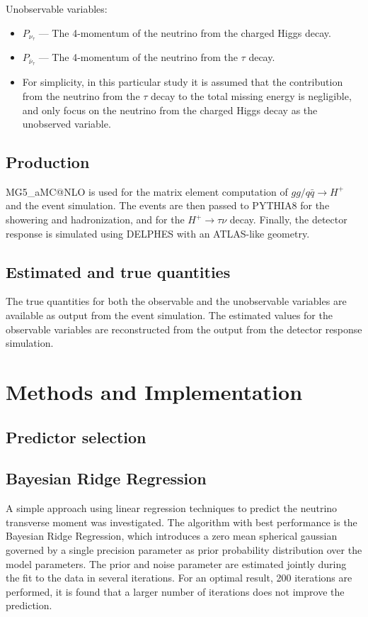 \documentclass{scrartcl}
\begin{document}
Unobservable variables:
\begin{itemize}
    \item $P_{\nu_\tau}$ --- The 4-momentum of the neutrino from the charged Higgs decay.
    \item $P_{\bar\nu_\tau}$ --- The 4-momentum of the neutrino from the $\tau$ decay.
    \item For simplicity, in this particular study it is assumed that the contribution from the neutrino from the $\tau$ decay to the total missing energy is negligible, and only focus on the neutrino from the charged Higgs decay as the unobserved variable. 
\end{itemize}

\subsection{Production}
MG5\_aMC@NLO \cite{Alwall:2014hca} is used for the matrix element computation of $gg / q \bar q \to H^+$ and the event simulation. The events are then passed to PYTHIA8 \cite{Sjöstrand2015159} for the showering and hadronization, and for the $H^+\to \tau\nu$ decay. Finally, the detector response is simulated using DELPHES \cite{Favereau2014} with an ATLAS-like geometry.

\subsection{Estimated and true quantities}
The true quantities for both the observable and the unobservable variables are available as output from the event simulation. The estimated values for the observable variables are reconstructed from the output from the detector response simulation.

\section{Methods and Implementation}

\subsection{Predictor selection}

\subsection{Bayesian Ridge Regression}

A simple approach using linear regression techniques to predict the neutrino transverse moment was investigated. The algorithm with best performance is the Bayesian Ridge Regression, which introduces a zero mean spherical gaussian governed by a single precision parameter as prior probability distribution over the model parameters. The prior and noise parameter are estimated jointly during the fit to the data in several iterations. For an optimal result, 200 iterations are performed, it is found that a larger number of iterations does not improve the prediction.
\end{document}
